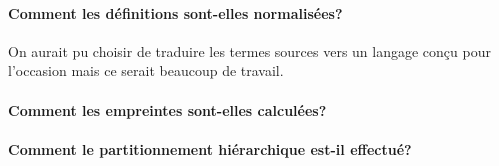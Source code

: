 \paragraph{Comment les définitions sont-elles normalisées?}
On aurait pu choisir de traduire les termes sources vers un langage conçu
pour l'occasion mais ce serait beaucoup de travail.

\paragraph{Comment les empreintes sont-elles calculées?}

\paragraph{Comment le partitionnement hiérarchique est-il effectué?}
